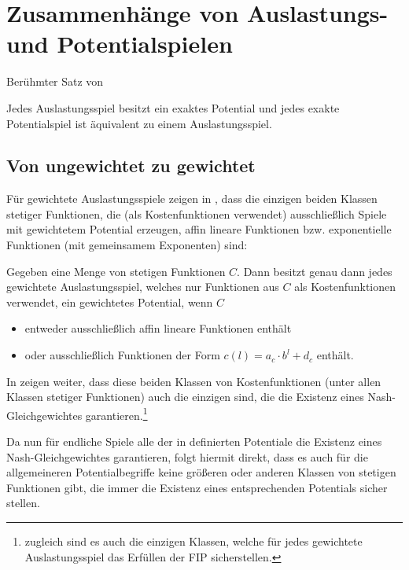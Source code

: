 \section{Zusammenhänge von Auslastungs- und Potentialspielen}\label{sec:Auslastungsspiele}


Berühmter Satz von \cite{MonShap}

\begin{satz}\label{satz:MondererShapley}
	Jedes Auslastungsspiel besitzt ein exaktes Potential und jedes exakte Potentialspiel ist äquivalent zu einem Auslastungsspiel.
\end{satz}

\subsection{Von ungewichtet zu gewichtet}

Für gewichtete Auslastungsspiele zeigen \citeauthor{CharExGewPotinWCG} in \cite[Theorem 3.9]{CharExGewPotinWCG}, dass die einzigen beiden Klassen stetiger Funktionen, die (als Kostenfunktionen verwendet) ausschließlich Spiele mit gewichtetem Potential erzeugen, affin lineare Funktionen bzw. exponentielle Funktionen (mit gemeinsamem Exponenten) sind:

\begin{satz}\label{satz:CharExGewPotinWCG}
	Gegeben eine Menge von stetigen Funktionen $C$. Dann besitzt genau dann jedes gewichtete Auslastungsspiel, welches nur Funktionen aus $C$ als Kostenfunktionen verwendet, ein gewichtetes Potential, wenn $C$
	\begin{itemize}
		\item entweder ausschließlich affin lineare Funktionen enthält
		\item oder ausschließlich Funktionen der Form $c(l) = a_c\cdot b^l + d_c$ enthält.
	\end{itemize}
\end{satz}

In \cite[Theorem 5.1]{CharExNGinWCG} zeigen \citeauthor{CharExNGinWCG} weiter, dass diese beiden Klassen von Kostenfunktionen (unter allen Klassen stetiger Funktionen) auch die einzigen sind, die die Existenz eines Nash-Gleichgewichtes garantieren.\footnote{zugleich sind es auch die einzigen Klassen, welche für jedes gewichtete Auslastungsspiel das Erfüllen der FIP sicherstellen.}

Da nun für endliche Spiele alle der in  definierten Potentiale die Existenz eines Nash-Gleichgewichtes garantieren, folgt hiermit direkt, dass es auch für die allgemeineren Potentialbegriffe keine größeren oder anderen Klassen von stetigen Funktionen gibt, die immer die Existenz eines entsprechenden Potentials sicher stellen.

